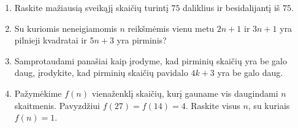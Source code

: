 \begin{enumerate}
  \item Raskite mažiausią sveikąjį skaičių turintį $75$ daliklius ir
    besidalijantį iš $75$.  
  \item Su kuriomis neneigiamomis $n$ reikšmėmis vienu metu $2n+1$ ir
    $3n+1$ yra pilnieji kvadratai ir $5n+3$ yra pirminis?  
  \item Samprotaudami panašiai kaip įrodyme, kad pirminių skaičių yra be
    galo daug, įrodykite, kad pirminių skaičių pavidalo $4k+3$ yra be galo
    daug.  
  \item Pažymėkime $f(n)$ vienaženklį skaičių, kurį gauname vis daugindami
    $n$ skaitmenis. Pavyzdžiui $f(27) = f(14) = 4$. Raskite visus
    $n$, su kuriais $f(n) = 1.$

\end{enumerate}
